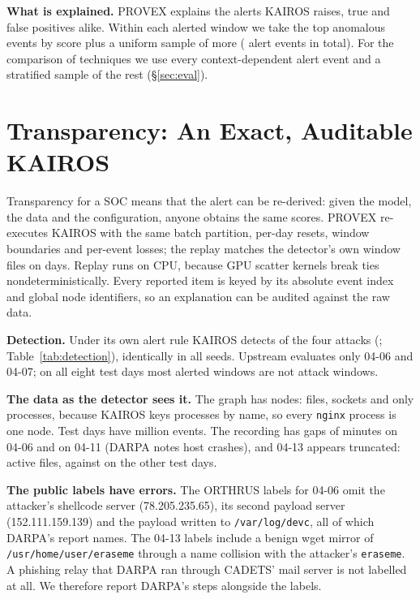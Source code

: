 \documentclass[conference]{IEEEtran}
\begin{document}
\textbf{What is explained.} PROVEX explains the alerts KAIROS raises, true and false positives alike.
Within each alerted window we take the top \TopN{} anomalous events by score plus a uniform sample of
\SampleN{} more (\NumAlertEvents{} alert events in total). For the comparison of techniques we use every
context-dependent alert event and a stratified sample of the rest (\S\ref{sec:eval}).

\section{Transparency: An Exact, Auditable KAIROS}
\label{sec:transparency}

Transparency for a SOC means that the alert can be re-derived: given the model, the data and the
configuration, anyone obtains the same scores. PROVEX re-executes KAIROS with the same batch partition,
per-day resets, window boundaries and per-event losses; the replay matches the detector's own window
files on \ParityDaysOK{} days. Replay runs on CPU, because GPU scatter kernels break ties
nondeterministically. Every reported item is keyed by its absolute event index and global node
identifiers, so an explanation can be audited against the raw data.

\textbf{Detection.} Under its own alert rule KAIROS detects \NumAttacksDetected{} of the four attacks
(\AttacksDetected{}; Table~\ref{tab:detection}), identically in all seeds. Upstream evaluates only 04-06
and 04-07; on all eight test days most alerted windows are not attack windows.

\textbf{The data as the detector sees it.} The graph has \NumNodes{} nodes: \NumFiles{} files,
\NumNetflows{} sockets and only \NumProcesses{} processes, because KAIROS keys processes by name, so
every \texttt{nginx} process is one node. Test days have \EventsPerTestDay{} million events. The
recording has gaps of \GapSixMin{} minutes on 04-06 and \GapElevenMin{} on 04-11 (DARPA notes host
crashes), and 04-13 appears truncated: \ActiveFilesThirteen{} active files, against
\ActiveFilesOtherTest{} on the other test days.

\textbf{The public labels have errors.} The ORTHRUS labels for 04-06 omit the attacker's shellcode server
(78.205.235.65), its second payload server (152.111.159.139) and the payload written to
\texttt{/var/log/devc}, all of which DARPA's report names. The 04-13 labels include a benign wget mirror
of \texttt{/usr/home/user/eraseme} through a name collision with the attacker's \texttt{eraseme}. A
phishing relay that DARPA ran through CADETS' mail server is not labelled at all. We therefore report
DARPA's steps alongside the labels.
\end{document}
